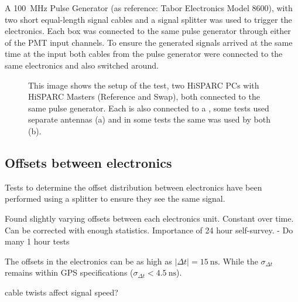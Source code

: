 A \SI{100}{\mega\hertz} Pulse Generator (as reference: Tabor Electronics
Model 8600), with two short equal-length signal cables and a signal
splitter was used to trigger the \hisparc electronics. Each box was
connected to the same pulse generator through either of the PMT input
channels. To ensure the generated signals arrived at the same time at
the input both cables from the pulse generator were connected to the
same \hisparc electronics and also switched around.

\begin{figure}
    \centering
    
    \caption{This image shows the setup of the test, two HiSPARC PCs
             with HiSPARC Masters (Reference and Swap), both connected
             to the same pulse generator. Each is also connected to a
             \gps, some tests used separate \gps antennas (a) and in
             some tests the same \gps was used by both (b).}
    \label{fig:setup}
\end{figure}


\subsection{Offsets between \hisparc electronics}
\label{sub:gps_offsets}

Tests to determine the offset distribution between \hisparc electronics
have been performed using a \gps splitter to ensure they see the same
\gps signal.

Found slightly varying offsets between each \hisparc electronics unit.
Constant over time. Can be corrected with enough statistics.
Importance of 24 hour self-survey. - Do many 1 hour tests


The offsets in the \hisparc electronics can be as high as $|\Delta t| =
\SI{15}{\nano\second}$. While the $\sigma_{\Delta t}$ remains within GPS
specifications ($\sigma_{\Delta t} < \SI{4.5}{\nano\second}$).


\gps cable twists affect signal speed?

